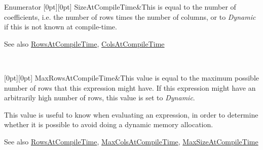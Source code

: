 \begin{DoxyEnumFields}{Enumerator}
[0pt][0pt]{}\mbox{\label{class_eigen_1_1_dense_base_a86241c772c74c04eeeb0480b99c5ab77a25cb495affdbd796198462b8ef06be91}} 
Size\+At\+Compile\+Time&This is equal to the number of coefficients, i.\+e. the number of rows times the number of columns, or to {\itshape Dynamic} if this is not known at compile-\/time. \begin{DoxySeeAlso}{See also}
\mbox{\hyperlink{class_eigen_1_1_dense_base_a86241c772c74c04eeeb0480b99c5ab77adb37c78ebbf15aa20b65c3b70415a1ab}{Rows\+At\+Compile\+Time}}, \mbox{\hyperlink{class_eigen_1_1_dense_base_a86241c772c74c04eeeb0480b99c5ab77a787f85fd67ee5985917eb2cef6e70441}{Cols\+At\+Compile\+Time}} 
\end{DoxySeeAlso}
\\
\hline

[0pt][0pt]{}\mbox{\label{class_eigen_1_1_dense_base_a86241c772c74c04eeeb0480b99c5ab77ad2baadea085372837b0e80dc93be1306}} 
Max\+Rows\+At\+Compile\+Time&This value is equal to the maximum possible number of rows that this expression might have. If this expression might have an arbitrarily high number of rows, this value is set to {\itshape Dynamic}.

This value is useful to know when evaluating an expression, in order to determine whether it is possible to avoid doing a dynamic memory allocation.

\begin{DoxySeeAlso}{See also}
\mbox{\hyperlink{class_eigen_1_1_dense_base_a86241c772c74c04eeeb0480b99c5ab77adb37c78ebbf15aa20b65c3b70415a1ab}{Rows\+At\+Compile\+Time}}, \mbox{\hyperlink{class_eigen_1_1_dense_base_a86241c772c74c04eeeb0480b99c5ab77acc3a41000cf1d29dd1a320b2a09d2a65}{Max\+Cols\+At\+Compile\+Time}}, \mbox{\hyperlink{class_eigen_1_1_dense_base_a86241c772c74c04eeeb0480b99c5ab77a3a459062d39cb34452518f5f201161d2}{Max\+Size\+At\+Compile\+Time}} 
\end{DoxySeeAlso}
\\
\hline


\end{DoxyEnumFields}
